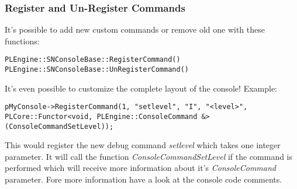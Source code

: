 \subsubsection{Register and Un-Register Commands}
It's possible to add new custom commands or remove old one with these functions:

\begin{lstlisting}[caption=Register and un-register commands]
PLEngine::SNConsoleBase::RegisterCommand()
PLEngine::SNConsoleBase::UnRegisterCommand()
\end{lstlisting}

It's even possible to customize the complete layout of the console! Example:

\begin{lstlisting}[caption=Register command]
pMyConsole->RegisterCommand(1, "setlevel", "I", "<level>", PLCore::Functor<void, PLEngine::ConsoleCommand &>(ConsoleCommandSetLevel));
\end{lstlisting}

This would register the new debug command \emph{setlevel} which takes one integer parameter. It will call the function \emph{ConsoleCommandSetLevel} if the command is performed which will receive more information about it's \emph{ConsoleCommand} parameter. Fore more information have a look at the console code comments.
